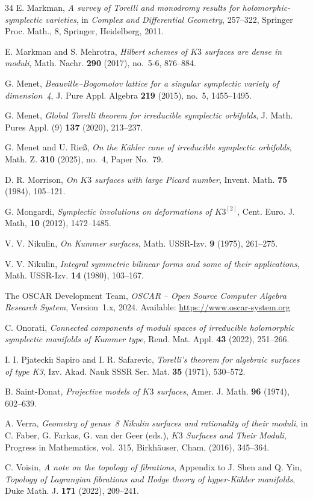 \documentclass{amsart}
\theoremstyle{definition}
\numberwithin{equation}{section}
\numberwithin{equation}{section} \theoremstyle{definition}
\begin{document}
\begin{thebibliography}{34}
 E. Markman,
  \emph{A survey of Torelli and monodromy results for holomorphic-symplectic
  varieties}, in {\it Complex and Differential Geometry}, 257--322, Springer
  Proc. Math., 8, Springer, Heidelberg, 2011.

 E. Markman and S. Mehrotra,
  \emph{Hilbert schemes of $K3$ surfaces are dense in moduli},
  Math. Nachr. {\bf 290} (2017), no.~5-6, 876--884.

 G. Menet,
  \emph{Beauville--Bogomolov lattice for a singular symplectic variety of
  dimension~4}, J. Pure Appl. Algebra {\bf 219} (2015), no.~5, 1455--1495.

 G. Menet,
  \emph{Global Torelli theorem for irreducible symplectic orbifolds},
  J. Math. Pures Appl. (9) {\bf 137} (2020), 213--237.

 G. Menet and U. Rie\ss,
  \emph{On the K\"ahler cone of irreducible symplectic orbifolds},
  Math. Z. {\bf 310} (2025), no.~4, Paper No.~79.

 D. R. Morrison,
  \emph{On $K3$ surfaces with large Picard number},
  Invent. Math. {\bf 75} (1984), 105--121.

 G. Mongardi,
  \emph{Symplectic involutions on deformations of $K3^{[2]}$}, Cent. Euro. J. Math,
 {\bf 10} (2012), 1472--1485.
 
  V. V. Nikulin,
  \emph{On Kummer surfaces}, Math. USSR-Izv. {\bf 9} (1975), 261--275.


 V. V. Nikulin,
  \emph{Integral symmetric bilinear forms and some of their applications},
  Math. USSR-Izv. {\bf 14} (1980), 103--167.


  The OSCAR Development Team,
  \textit{OSCAR -- Open Source Computer Algebra Research System},
  Version~1.x,
  2024.
  Available: \url{https://www.oscar-system.org}


 C. Onorati,
  \emph{Connected components of moduli spaces of irreducible holomorphic
  symplectic manifolds of Kummer type},
  Rend. Mat. Appl. {\bf 43} (2022), 251--266.
 
   I. I. Pjateckiı Sapiro and I. R.
Safarevic, \emph{Torelli’s theorem for algebraic surfaces of
type K3}, Izv. Akad. Nauk SSSR Ser. Mat. {\bf 35} (1971), 530–572.

 B. Saint-Donat,
  \emph{Projective models of $K3$ surfaces},
  Amer. J. Math. {\bf 96} (1974), 602--639.

 A. Verra,
  \emph{Geometry of genus~8 Nikulin surfaces and rationality of their moduli},
  in C. Faber, G. Farkas, G. van der Geer (eds.), {\it $K3$ Surfaces and Their
  Moduli}, Progress in Mathematics, vol.~315, Birkh\"auser, Cham, (2016),
   345--364.

 C. Voisin, \emph{A note on the topology of fibrations}, Appendix to J. Shen and Q. Yin, \emph{Topology of Lagrangian fibrations and Hodge theory of hyper-K\"ahler manifolds}, Duke Math. J. {\bf 171} (2022), 209--241.
\end{thebibliography}
\end{document}
